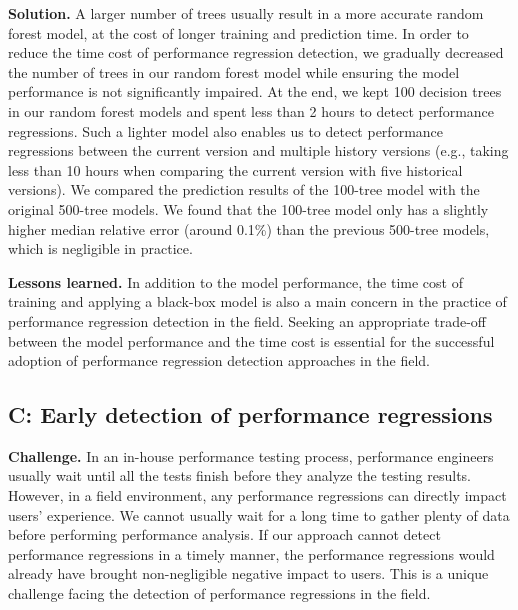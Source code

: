 \noindent\textbf{Solution.}
A larger number of trees usually result in a more accurate random forest model, at the cost of longer training and prediction time.
In order to reduce the time cost of performance regression detection, we gradually decreased the number of trees in our random forest model while ensuring the model performance is not significantly impaired.
At the end, we kept 100 decision trees in our random forest models and spent less than 2 hours to detect performance regressions. %
Such a lighter model also enables us to detect performance regressions between the current version and multiple history versions (e.g., taking less than 10 hours when comparing the current version with five historical versions). 
We compared the prediction results of the 100-tree model with the original 500-tree models. We found that the 100-tree model only has a slightly higher median relative error (around 0.1\%) than the previous 500-tree models, which is negligible in practice. %

\noindent\textbf{Lessons learned.}
In addition to the model performance, the time cost of training and applying a black-box model is also a main concern in the practice of performance regression detection in the field. %
Seeking an appropriate trade-off between the model performance and the time cost is essential for the successful adoption of performance regression detection approaches in the field.


\subsection*{C: Early detection of performance regressions}
\noindent\textbf{Challenge.}
In an in-house performance testing process, performance engineers usually wait until all the tests finish before they analyze the testing results.
However, in a field environment, any performance regressions can directly impact users' experience.
We cannot usually wait for a long time to gather plenty of data before performing performance analysis.
If our approach cannot detect performance regressions in a timely manner, the performance regressions would already have brought non-negligible negative impact to users.
This is a unique challenge facing the detection of performance regressions in the field.

